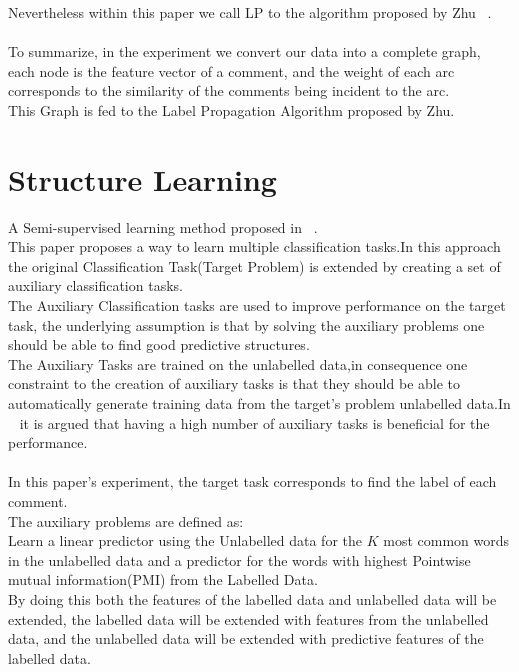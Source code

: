 \documentclass[4pt,a4paper,twocolumn]{article}
\begin{document}
Nevertheless within this paper we call LP to the algorithm proposed by Zhu ~\cite{Zhu:2005:SLG:1104523}.\\
\\
To summarize, in the experiment we convert our data into a complete graph,
each node is the feature vector of a comment, and the weight of each arc
corresponds to the similarity of the comments being incident to the arc.\\
This Graph is  fed to the Label Propagation Algorithm proposed by Zhu.\\



 
\section{Structure Learning}
A Semi-supervised learning method proposed in ~\cite{Ando:2005:FLP:1046920.1194905}.\\
This paper proposes a way to learn multiple classification tasks.In this approach the original Classification Task(Target Problem) is extended by creating a set of auxiliary classification tasks.\\
The Auxiliary Classification tasks are used to improve performance on the target task,
the underlying assumption is that by solving the auxiliary problems one should be able to find good predictive structures.\\
The Auxiliary Tasks are trained on the unlabelled data,in consequence one constraint to the creation of auxiliary tasks is that they should be able to automatically generate training data from the target's problem unlabelled data.In ~\cite{Ando:2005:HSL:1219840.1219841} it is argued that having a high number of auxiliary tasks is beneficial for the performance.\\
\\
In this paper's experiment, the target task corresponds to find the label of each comment.\\
The auxiliary problems are defined as:\\
Learn a linear predictor using the Unlabelled data for the $K$ most common words in the unlabelled data and a predictor for the words with highest Pointwise mutual information(PMI) from the Labelled Data.\\
By doing this both the features of the labelled data and unlabelled data will be extended, the labelled data will be extended with features from the unlabelled data, and the unlabelled data will be extended with predictive features of the labelled data.\\
\end{document}
